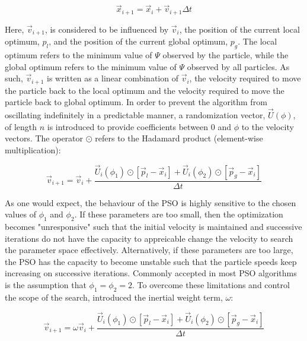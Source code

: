 \begin{equation}
\vec{x}_{i+1} = \vec{x}_i + \vec{v}_{i+1} \Delta t
\label{eqn:psoupdate}
\end{equation}

Here, $\vec{v}_{i+1}$, is considered to be influenced by $\vec{v}_i$, the position of the current local optimum, $p_l$, and the position of the current global optimum, $p_g$. The local optimum refers to the minimum value of $\Psi$ observed by the particle, while the global optimum refers to the minimum value of $\Psi$ observed by all particles. As such,  $\vec{v}_{i+1}$ is written as a linear combination of $\vec{v}_{i}$, the velocity required to move the particle back to the local optimum and the velocity required to move the particle back to global optimum. In order to prevent the algorithm from oscillating indefinitely in a predictable manner, a randomization vector, $\vec{U}\left(\phi\right)$, of length $n$ is introduced to provide coefficients between 0 and $\phi$ to the velocity vectors. The operator $\odot$ refers to the Hadamard product (element-wise multiplication):

\begin{equation}
\vec{v}_{i+1} = \vec{v}_i + \frac{\vec{U}_i\left(\phi_1\right)\odot\left[\vec{p}_l-\vec{x}_i\right] + \vec{U}_i\left(\phi_2\right)\odot\left[\vec{p}_g-\vec{x}_i\right]}{\Delta t}
\label{eqn:psobasic}
\end{equation}

As one would expect, the behaviour of the PSO is highly sensitive to the chosen values of $\phi_1$ and $\phi_2$. If these parameters are too small, then the optimization becomes "unresponsive" such that the initial velocity is maintained and successive iterations do not have the capacity to appreicable change the velocity to search the parameter space effectively. Alternatively, if these parameters are too large, the PSO has the capacity to become unstable such that the particle speeds keep increasing on successive iterations. Commonly accepted in most PSO algorithms is the assumption that $\phi_1 = \phi_2 = 2$. To overcome these limitations and control the scope of the search, \citet{Shi} introduced the inertial weight term, $\omega$:

\begin{equation}
\vec{v}_{i+1} = \omega\vec{v}_i + \frac{\vec{U}_i\left(\phi_1\right)\odot\left[\vec{p}_l-\vec{x}_i\right] + \vec{U}_i\left(\phi_2\right)\odot\left[\vec{p}_g-\vec{x}_i\right]}{\Delta t}
\label{eqn:psoinertia}
\end{equation}

